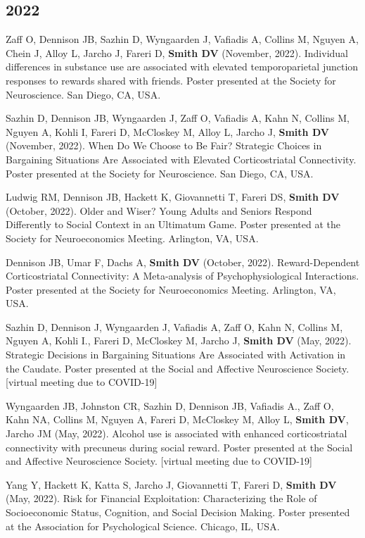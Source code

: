 \documentclass[11pt, letterpaper]{article}
\begin{document}
\subsection*{2022}
\begin{hangparas}{.5in}{1}

Zaff O, Dennison JB, Sazhin D, Wyngaarden J, Vafiadis A, Collins M, Nguyen A, Chein J, Alloy L, Jarcho J, Fareri D, \textbf{Smith DV} (November, 2022). Individual differences in substance use are associated with elevated temporoparietal junction responses to rewards shared with friends. Poster presented at the Society for Neuroscience. San Diego, CA, USA.

Sazhin D, Dennison JB, Wyngaarden J, Zaff O, Vafiadis A, Kahn N, Collins M, Nguyen A, Kohli I, Fareri D, McCloskey M, Alloy L, Jarcho J, \textbf{Smith DV} (November, 2022). When Do We Choose to Be Fair? Strategic Choices in Bargaining Situations Are Associated with Elevated Corticostriatal Connectivity. Poster presented at the Society for Neuroscience. San Diego, CA, USA.

Ludwig RM, Dennison JB, Hackett K, Giovannetti T, Fareri DS, \textbf{Smith DV} (October, 2022). Older and Wiser? Young Adults and Seniors Respond Differently to Social Context in an Ultimatum Game. Poster presented at the Society for Neuroeconomics Meeting. Arlington, VA, USA.
 
Dennison JB, Umar F, Dachs A, \textbf{Smith DV} (October, 2022). Reward-Dependent Corticostriatal Connectivity: A Meta-analysis of Psychophysiological Interactions. Poster presented at the Society for Neuroeconomics Meeting. Arlington, VA, USA.

Sazhin D, Dennison J, Wyngaarden J, Vafiadis A, Zaff O, Kahn N, Collins M, Nguyen A, Kohli I., Fareri D, McCloskey M, Jarcho J, \textbf{Smith DV} (May, 2022). Strategic Decisions in Bargaining Situations Are Associated with Activation in the Caudate. Poster presented at the Social and Affective Neuroscience Society. [virtual meeting due to COVID-19]

Wyngaarden JB, Johnston CR, Sazhin D, Dennison JB, Vafiadis A., Zaff O, Kahn NA, Collins M, Nguyen A, Fareri D, McCloskey M, Alloy L, \textbf{Smith DV}, Jarcho JM (May, 2022). Alcohol use is associated with enhanced corticostriatal connectivity with precuneus during social reward. Poster presented at the Social and Affective Neuroscience Society. [virtual meeting due to COVID-19]

Yang Y, Hackett K, Katta S, Jarcho J, Giovannetti T, Fareri D, \textbf{Smith DV} (May, 2022). Risk for Financial Exploitation: Characterizing the Role of Socioeconomic Status, Cognition, and Social Decision Making. Poster presented at the Association for Psychological Science. Chicago, IL, USA.


\end{hangparas}
\end{document}
